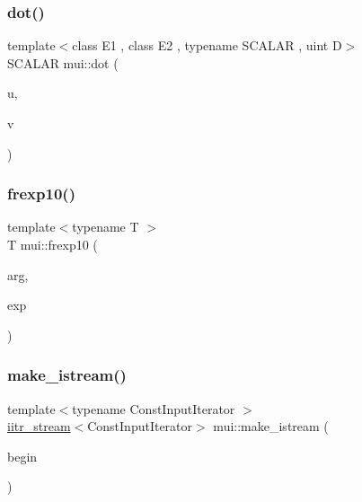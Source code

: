 \subsubsection{\texorpdfstring{dot()}{dot()}}
{\footnotesize\ttfamily template$<$class E1 , class E2 , typename S\+C\+A\+L\+AR , uint D$>$ \\
S\+C\+A\+L\+AR mui\+::dot (\begin{DoxyParamCaption}\item[{\hyperlink{structmui_1_1vexpr}{vexpr}$<$ E1, S\+C\+A\+L\+AR, D $>$ const \&}]{u,  }\item[{\hyperlink{structmui_1_1vexpr}{vexpr}$<$ E2, S\+C\+A\+L\+AR, D $>$ const \&}]{v }\end{DoxyParamCaption})\hspace{0.3cm}{\ttfamily [inline]}}

\mbox{\label{namespacemui_a300c1ee6082d9a5ce567f3d48223cf59}} 
\subsubsection{\texorpdfstring{frexp10()}{frexp10()}}
{\footnotesize\ttfamily template$<$typename T $>$ \\
T mui\+::frexp10 (\begin{DoxyParamCaption}\item[{T}]{arg,  }\item[{int \&}]{exp }\end{DoxyParamCaption})\hspace{0.3cm}{\ttfamily [inline]}}

\mbox{\label{namespacemui_ae8d0efd50a0aaece37066d01debfc74d}} 
\subsubsection{\texorpdfstring{make\+\_\+istream()}{make\_istream()}}
{\footnotesize\ttfamily template$<$typename Const\+Input\+Iterator $>$ \\
\hyperlink{classmui_1_1iitr__stream}{iitr\+\_\+stream}$<$Const\+Input\+Iterator$>$ mui\+::make\+\_\+istream (\begin{DoxyParamCaption}\item[{Const\+Input\+Iterator}]{begin }\end{DoxyParamCaption})}

